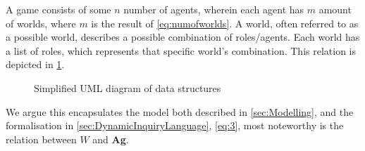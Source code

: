 A game consists of some $n$ number of agents, wherein each agent has $m$ amount
of worlds, where $m$ is the result of \cref{eq:numofworlds}. A world, often
referred to as a possible world, describes a possible combination of
roles/agents. Each world has a list of roles, which represents that specific
world's combination. This relation is depicted in \cref{fig:DataStructuresUML}.
\begin{comment}
To provide some context for the upcoming sections, this part will describe the
data structures they are based upon. \\ \\ A world, often
referred to as a possible world, describes a possible combination of roles/agents.
Most information is unknown to an agent in its environment,
therefore if a role of another agent is unknown they could be all roles. So for
each agent, they store their own list of all possible worlds, with every single
combination of agents and roles. Each world object itself stores whether it is active,
and number of marks. Marks and is active\footnote{Is active refers to active and inactive
	worlds} both being previously described in \cref{sec:Modelling}.\\ The
player object stores information about the agent, such as name, role, and alive
status. Besides storing information it acts as a gateway to functions that
include the agent. Such as communication, instead of calling a function and
including the agent, the communication is called directly from the agent object. \\
The overall data structure is the game object, that encapsulates all
information and objects into a single object.
\end{comment}
\renewcommand{\umlfillcolor}{white}
\renewcommand{\umldrawcolor}{blue}
\begin{figure}[H]
	\centering
	\vspace*{3mm}
	\caption{Simplified UML diagram of data structures}
	\label{fig:DataStructuresUML}
\end{figure}
We argue this encapsulates the model both described in \cref{sec:Modelling}, and the formalisation in
\cref{sec:DynamicInquiryLanguage}, \cref{eq:3}, most noteworthy is the relation between $W$ and \textbf{Ag}.
